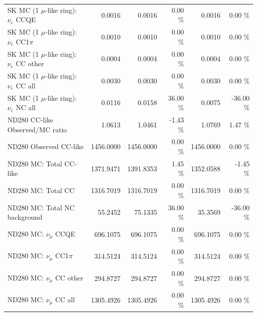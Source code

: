 \begin{table}
\begin{tabular}{| l | r | r  r | r  r |}
                             SK MC (1 $\mu$-like ring): $\nu_{e}$ CCQE &          0.0016 &          0.0016 &  0.00 \%  &          0.0016 &  0.00 \%  \\ 
                         SK MC (1 $\mu$-like ring): $\nu_{e}$ CC1$\pi$ &          0.0010 &          0.0010 &  0.00 \%  &          0.0010 &  0.00 \%  \\ 
                         SK MC (1 $\mu$-like ring): $\nu_{e}$ CC other &          0.0004 &          0.0004 &  0.00 \%  &          0.0004 &  0.00 \%  \\ 
                           SK MC (1 $\mu$-like ring): $\nu_{e}$ CC all &          0.0030 &          0.0030 &  0.00 \%  &          0.0030 &  0.00 \%  \\ 
                           SK MC (1 $\mu$-like ring): $\nu_{e}$ NC all &          0.0116 &          0.0158 & 36.00 \%  &          0.0075 & -36.00 \%  \\ 
\hline
                                       ND280 CC-like Observed/MC ratio &          1.0613 &          1.0461 & -1.43 \%  &          1.0769 &  1.47 \%  \\ 
                                                ND280 Observed CC-like &       1456.0000 &       1456.0000 &  0.00 \%  &       1456.0000 &  0.00 \%  \\ 
                                               ND280 MC: Total CC-like &       1371.9471 &       1391.8353 &  1.45 \%  &       1352.0588 & -1.45 \%  \\ 
                                                    ND280 MC: Total CC &       1316.7019 &       1316.7019 &  0.00 \%  &       1316.7019 &  0.00 \%  \\ 
                                         ND280 MC: Total NC background &         55.2452 &         75.1335 & 36.00 \%  &         35.3569 & -36.00 \%  \\ 
\hline
                                            ND280 MC: $\nu_{\mu}$ CCQE &        696.1075 &        696.1075 &  0.00 \%  &        696.1075 &  0.00 \%  \\ 
                                        ND280 MC: $\nu_{\mu}$ CC1$\pi$ &        314.5124 &        314.5124 &  0.00 \%  &        314.5124 &  0.00 \%  \\ 
                                        ND280 MC: $\nu_{\mu}$ CC other &        294.8727 &        294.8727 &  0.00 \%  &        294.8727 &  0.00 \%  \\ 
                                          ND280 MC: $\nu_{\mu}$ CC all &       1305.4926 &       1305.4926 &  0.00 \%  &       1305.4926 &  0.00 \%  \\ 

\end{tabular}
\end{table}
